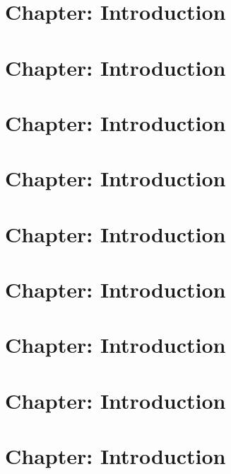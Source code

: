 \documentclass[11pt, a4paper]{article}
\begin{document}
\begin{Form}
\section*{Chapter: Introduction}

\section*{Chapter: Introduction}

\section*{Chapter: Introduction}

\section*{Chapter: Introduction}

\section*{Chapter: Introduction}

\section*{Chapter: Introduction}

\section*{Chapter: Introduction}

\section*{Chapter: Introduction}

\section*{Chapter: Introduction}


\end{Form}
\end{document}
